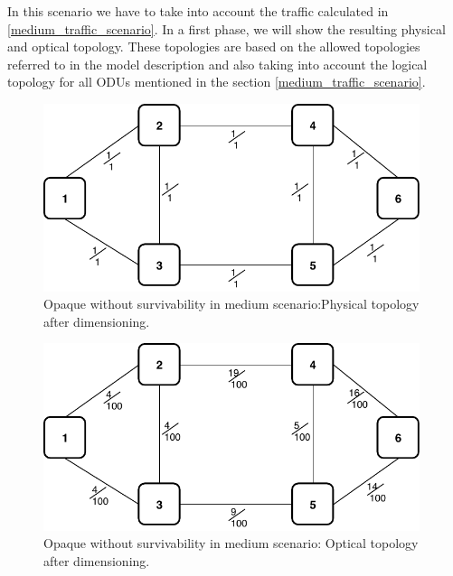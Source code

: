 In this scenario we have to take into account the traffic calculated in \ref{medium_traffic_scenario}. In a first
phase, we will show the resulting physical and optical topology. These topologies are based on the allowed topologies referred to in the model description and also taking into account the logical topology for all ODUs mentioned in the section \ref{medium_traffic_scenario}.
\begin{figure}[h!]
\centering
\includegraphics[width=11cm]{sdf/ilp/opaque_survivability/figures/physical_topology}
\caption{Opaque without survivability in medium scenario:Physical topology after dimensioning.}
\label{physical_medium}
\end{figure}

\begin{figure}[h!]
\centering
\includegraphics[width=11cm]{sdf/ilp/opaque_survivability/figures/optical_topology_medium}
\caption{Opaque without survivability in medium scenario: Optical topology after dimensioning.}
\label{optical_medium}
\end{figure}

